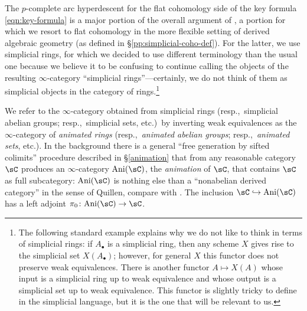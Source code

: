 The $p$-complete arc hyperdescent for the flat cohomology side of the key formula \eqref{eqn:key-formula}  is a major portion of the overall argument of , a portion for which we resort to flat cohomology in the more flexible setting of derived algebraic geometry (as defined in \S\ref{pp:simplicial-coho-def}). For the latter, we use simplicial rings, for which
we decided to use %
different terminology than the usual one because we believe it to be confusing to continue calling  the objects of the resulting $\infty$-category ``simplicial rings''---certainly, we do not think of them as simplicial objects in the category of rings.\footnote{The following standard example explains why we do not like to think in terms of simplicial rings: if $A_\bullet$ is a simplicial ring, then any scheme $X$ gives rise to the simplicial set $X(A_\bullet)$; however, for general $X$ this functor does not preserve weak equivalences. There is another functor $A\mapsto X(A)$ whose input is a simplicial ring up to weak equivalence and whose output is a simplicial set up to weak equivalence. This functor is slightly tricky to define in the simplicial language, but it is the one that will be relevant to us.}

We refer to the $\infty$-category obtained from simplicial rings (resp.,~simplicial abelian groups; resp.,~simplicial sets, etc.)~by inverting weak equivalences as the $\infty$-category of \emph{animated rings} (resp.,~\emph{animated abelian groups}; resp.,~\emph{animated sets}, etc.). In the background there is a general ``free generation by sifted colimits'' procedure described in \S\ref{animation} that from any reasonable category $\sC$ produces an $\infty$-category $\mathrm{Ani}(\sC)$, the \emph{animation} of $\sC$, that contains $\sC$ as full subcategory: $\mathrm{Ani}(\sC)$ is nothing else than a ``nonabelian derived category'' in the sense of Quillen, compare with \cite[Section 5.5.8]{HTT}. The inclusion $\sC\hookrightarrow \mathrm{Ani}(\sC)$ has a left adjoint $\pi_0\colon \mathrm{Ani}(\sC)\to \sC$.

